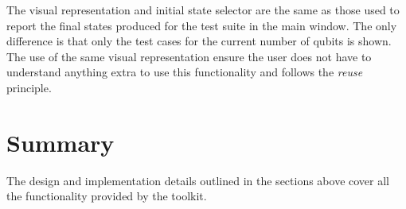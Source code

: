 The visual representation and initial state selector are the same as those used to report the final states produced for the test suite in the main window.
The only difference is that only the test cases for the current number of qubits is shown.
The use of the same visual representation ensure the user does not have to understand anything extra to use this functionality and follows the \emph{reuse} principle.

\section{Summary}

The design and implementation details outlined in the sections above cover all the functionality provided by the toolkit.




